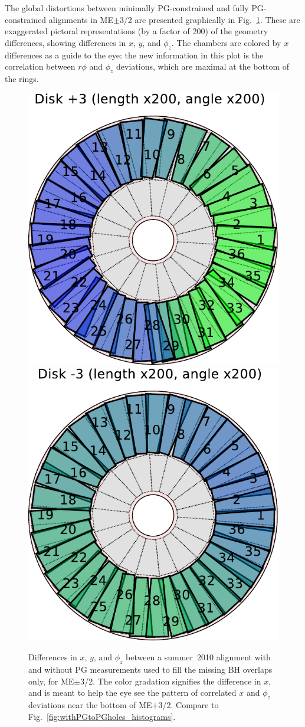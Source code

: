 \documentclass[12pt]{article}
\begin{document}
The global distortions between minimally PG-constrained and fully
PG-constrained alignments in ME$\pm$3/2 are presented graphically in
Fig.~\ref{fig:withPGtoPGholes_me3_picture}.  These are exaggerated
pictoral representations (by a factor of 200) of the geometry
differences, showing differences in $x$, $y$, and $\phi_z$.  The
chambers are colored by $x$ differences as a guide to the eye: the new
information in this plot is the correlation between $r\phi$ and
$\phi_z$ deviations, which are maximal at the bottom of the rings.

\begin{figure}
\begin{center}
\includegraphics[width=0.45\linewidth]{withPGtoPGholes_mep3_picture.pdf}
\includegraphics[width=0.45\linewidth]{withPGtoPGholes_mem3_picture.pdf}
\end{center}
\caption{Differences in $x$, $y$, and $\phi_z$ between a summer~2010
  alignment with and without PG measurements used to fill the missing
  BH overlaps only, for ME$\pm$3/2.  The color gradation signifies the
  difference in $x$, and is meant to help the eye see the pattern of
  correlated $x$ and $\phi_z$ deviations near the bottom of ME$+$3/2.
  Compare to
  Fig.~\ref{fig:withPGtoPGholes_histograms}.  \label{fig:withPGtoPGholes_me3_picture}}
\end{figure}
\end{document}
